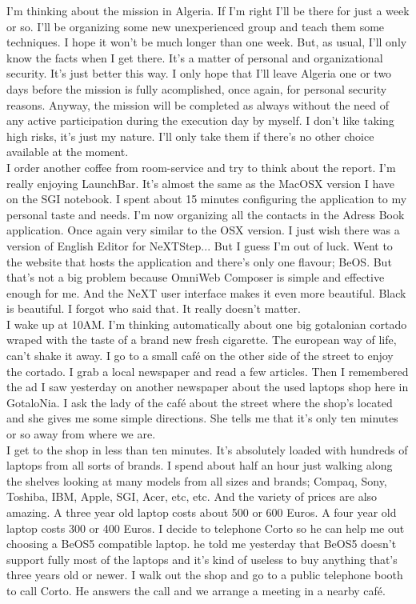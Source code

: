 \documentclass[11pt,twoside,a4paper]{book}
\begin{document}
\begin{multicols*}{2}
    I'm thinking about the mission in Algeria. If I'm right I'll be there for just a week or so. I'll be organizing some new unexperienced group and teach them some techniques. I hope it won't be much longer than one week. But, as usual, I'll only know the facts when I get there. It's a matter of personal and organizational security. It's just better this way. I only hope that I'll leave Algeria one or two days before the mission is fully acomplished, once again, for personal security reasons. Anyway, the mission will be completed as always without the need of any active participation during the execution day by myself. I don't like taking high risks, it's just my nature. I'll only take them if there's no other choice available at the moment. ~\\

    I order another coffee from room-service and try to think about the report. I'm really enjoying LaunchBar. It's almost the same as the MacOSX version I have on the SGI notebook. I spent about 15 minutes configuring the application to my personal taste and needs. I'm now organizing all the contacts in the Adress Book application. Once again very similar to the OSX version. I just wish there was a version of English Editor for NeXTStep... But I guess I'm out of luck. Went to the website that hosts the application and there's only one flavour; BeOS. But that's not a big problem because OmniWeb Composer is simple and effective enough for me. And the NeXT user interface makes it even more beautiful. Black is beautiful. I forgot who said that. It really doesn't matter. ~\\

    I wake up at 10AM. I'm thinking automatically about one big gotalonian cortado wraped with the taste of a brand new fresh cigarette. The european way of life, can't shake it away. I go to a small caf{\'e} on the other side of the street to enjoy the cortado. I grab a local newspaper and read a few articles. Then I remembered the ad I saw yesterday on another newspaper about the used laptops shop here in GotaloNia. I ask the lady of the caf{\'e} about the street where the shop's located and she gives me some simple directions. She tells me that it's only ten minutes or so away from where we are. ~\\

    I get to the shop in less than ten minutes. It's absolutely loaded with hundreds of laptops from all sorts of brands. I spend about half an hour just walking along the shelves looking at many models from all sizes and brands; Compaq, Sony, Toshiba, IBM, Apple, SGI, Acer, etc, etc. And the variety of prices are also amazing. A three year old laptop costs about 500 or 600 Euros. A four year old laptop costs 300 or 400 Euros. I decide to telephone Corto so he can help me out choosing a BeOS5 compatible laptop. he told me yesterday that BeOS5 doesn't support fully most of the laptops and it's kind of useless to buy anything that's three years old or newer. I walk out the shop and go to a public telephone booth to call Corto. He answers the call and we arrange a meeting in a nearby caf{\'e}. ~\\


\end{multicols*}
\end{document}
